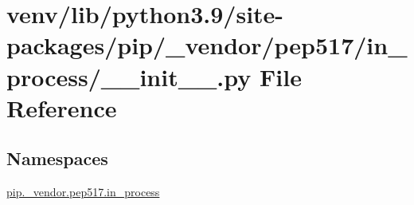 \hypertarget{venv_2lib_2python3_89_2site-packages_2pip_2__vendor_2pep517_2in__process_2____init_____8py}{}\section{venv/lib/python3.9/site-\/packages/pip/\+\_\+vendor/pep517/in\+\_\+process/\+\_\+\+\_\+init\+\_\+\+\_\+.py File Reference}
\label{venv_2lib_2python3_89_2site-packages_2pip_2__vendor_2pep517_2in__process_2____init_____8py}
\subsection*{Namespaces}
\begin{DoxyCompactItemize}
\item 
 \hyperlink{namespacepip_1_1__vendor_1_1pep517_1_1in__process}{pip.\+\_\+vendor.\+pep517.\+in\+\_\+process}
\end{DoxyCompactItemize}
